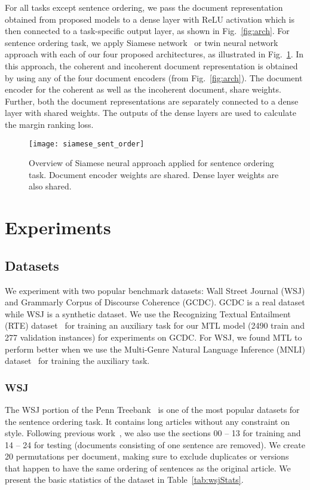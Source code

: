 \documentclass[11pt]{article}
\begin{document}
For all tasks except sentence ordering, we pass the document representation obtained from proposed models to a dense layer with ReLU activation which is then connected to a task-specific output layer, as shown in Fig.~\ref{fig:arch}. For sentence ordering task, we apply Siamese network~\cite{bromley1993signature} or twin neural network approach with each of our four proposed architectures, as illustrated in Fig.~\ref{fig:siamese_sent_order}. In this approach, the coherent and incoherent document representation is obtained by using any of the four document encoders (from Fig.~\ref{fig:arch}). The document encoder for the coherent as well as the incoherent document, share weights. Further, both the document representations are separately connected to a dense layer with shared weights. The outputs of the dense layers are used to calculate the margin ranking loss.

\begin{figure}
    \centering
    \texttt{[image: siamese\_sent\_order]}
    \caption{Overview of Siamese neural approach applied for sentence ordering task. Document encoder weights are shared. Dense layer weights are also shared.}
    \label{fig:siamese_sent_order}
\end{figure}

\section{Experiments}
\label{sec:experiments}
\subsection{Datasets}
We experiment with two popular benchmark datasets: Wall Street Journal (WSJ) and Grammarly Corpus of Discourse Coherence (GCDC). GCDC is a real dataset while WSJ is a synthetic dataset. We use the Recognizing Textual Entailment (RTE) dataset~\cite{wang2019superglue} for training an auxiliary task for our MTL model (2490 train and 277 validation  instances) for experiments on GCDC. For WSJ, we found MTL to perform better when we use the Multi-Genre Natural Language Inference (MNLI) dataset~\cite{N18-1101} for training the auxiliary task.

\subsubsection{WSJ} 
The WSJ portion of the Penn Treebank~\cite{elsner2008coreference,nguyen2017neural} is one of the most popular datasets for the sentence ordering task. It contains long articles without any constraint on style. Following previous work~\cite{barzilay2008modeling,nguyen2017neural}, we also use the sections 00 -- 13 for training and 14 -- 24 for testing (documents consisting of one sentence are removed). We create 20 permutations per document, making sure to exclude duplicates or versions that happen to have the same ordering of sentences as the original article. We present the basic statistics of the dataset in Table~\ref{tab:wsjStats}. 
\end{document}

